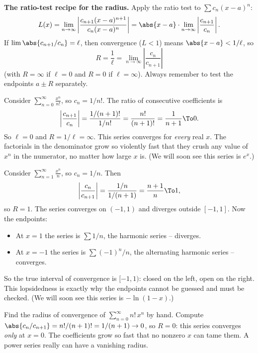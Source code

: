 \begin{focusbox}
\textbf{The ratio-test recipe for the radius.} Apply the ratio test to $\sum c_n(x-a)^n$:
\[
  L(x) = \lim_{n\to\infty}\left|\frac{c_{n+1}(x-a)^{n+1}}{c_n(x-a)^n}\right|
       = \abs{x-a}\cdot \lim_{n\to\infty}\left|\frac{c_{n+1}}{c_n}\right|.
\]
If $\lim \abs{c_{n+1}/c_n} = \ell$, then convergence ($L<1$) means $\abs{x-a} < 1/\ell$, so
\[
  \boxed{\,R = \frac{1}{\ell} = \lim_{n\to\infty}\left|\frac{c_n}{c_{n+1}}\right|\,}
\]
(with $R=\infty$ if $\ell=0$ and $R=0$ if $\ell=\infty$). Always remember to test the endpoints $a\pm R$ separately.
\end{focusbox}

\begin{example}
\label{ch30:ex-exp-radius}
Consider $\displaystyle\sum_{n=0}^{\infty}\frac{x^n}{n!}$, so $c_n = 1/n!$. The ratio of consecutive coefficients is
\[
  \left|\frac{c_{n+1}}{c_n}\right| = \frac{1/(n+1)!}{1/n!} = \frac{n!}{(n+1)!} = \frac{1}{n+1} \To 0.
\]
So $\ell = 0$ and $R = 1/\ell = \infty$. This series converges for \emph{every} real $x$. The factorials in the denominator grow so violently fast that they crush any value of $x^n$ in the numerator, no matter how large $x$ is. (We will soon see this series is $e^x$.)
\end{example}

\begin{example}
\label{ch30:ex-ln-radius}
Consider $\displaystyle\sum_{n=1}^{\infty}\frac{x^n}{n}$, so $c_n = 1/n$. Then
\[
  \left|\frac{c_n}{c_{n+1}}\right| = \frac{1/n}{1/(n+1)} = \frac{n+1}{n} \To 1,
\]
so $R = 1$. The series converges on $(-1,1)$ and diverges outside $[-1,1]$. Now the endpoints:
\begin{itemize}
  \item At $x = 1$ the series is $\sum 1/n$, the harmonic series -- diverges.
  \item At $x = -1$ the series is $\sum (-1)^n/n$, the alternating harmonic series -- converges.
\end{itemize}
So the true interval of convergence is $[-1, 1)$: closed on the left, open on the right. This lopsidedness is exactly why the endpoints cannot be guessed and must be checked. (We will soon see this series is $-\ln(1-x)$.)
\end{example}

\begin{labbox}
Find the radius of convergence of $\displaystyle\sum_{n=0}^{\infty} n!\, x^n$ by hand. Compute $\abs{c_n/c_{n+1}} = n!/(n+1)! = 1/(n+1) \to 0$, so $R = 0$: this series converges \emph{only} at $x=0$. The coefficients grow so fast that no nonzero $x$ can tame them. A power series really can have a vanishing radius.
\end{labbox}


